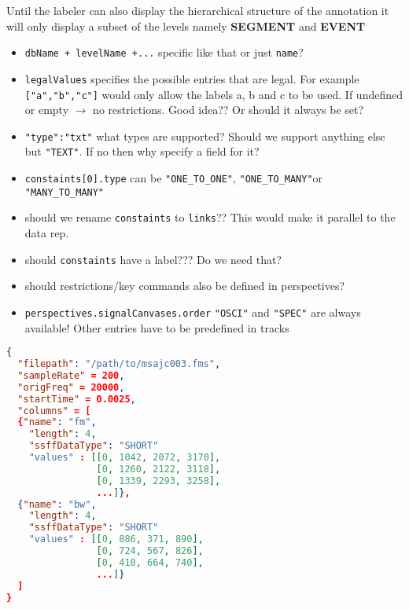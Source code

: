 \documentclass[A4,12pt, utf8]{article}
\begin{document}
Until the labeler can also display the hierarchical structure of the annotation it will only 
display a subset of the levels namely \textbf{SEGMENT} and \textbf{EVENT}




\begin{itemize}
  \item \texttt{dbName + levelName +...} specific like that or just \texttt{name}?
  \item \texttt{legalValues} specifies the possible entries that are legal. For example \texttt{["a","b","c"]} would only allow the labels a, b and c to be used. If undefined or empty $\rightarrow$ no restrictions. Good idea?? Or should it always be set?
  \item \texttt{"type":"txt"} what types are supported? Should we support anything else but \texttt{"TEXT"}. If no then why specify a field for it?
  \item \texttt{constaints[0].type} can be \texttt{"ONE\_TO\_ONE"}, \texttt{"ONE\_TO\_MANY"}or \texttt{"MANY\_TO\_MANY"}
  \item should we rename \texttt{constaints} to \texttt{links}?? This would make it parallel to the data rep.
  \item should \texttt{constaints} have a label??? Do we need that?
  \item should restrictions/key commands also be defined in perspectives?
  \item \texttt{perspectives.signalCanvases.order} \texttt{"OSCI"} and \texttt{"SPEC"} are always available! Other entries have to be predefined in tracks 
\end{itemize}





\begin{lstlisting}[caption=EMU-webApp internal derived signal representation, label=idsr, language=json,firstnumber=1]
{
  "filepath": "/path/to/msajc003.fms",
  "sampleRate" = 200,
  "origFreq" = 20000,
  "startTime" = 0.0025,
  "columns" = [
  {"name": "fm",
    "length": 4,
    "ssffDataType": "SHORT"
    "values" : [[0, 1042, 2072, 3170],
                [0, 1260, 2122, 3118],
                [0, 1339, 2293, 3258],
                ...]},
  {"name": "bw",
    "length": 4,
    "ssffDataType": "SHORT"
    "values" : [[0, 886, 371, 890],
                [0, 724, 567, 826],
                [0, 410, 664, 740],
                ...]}
  ]
}
\end{lstlisting}
\end{document}
